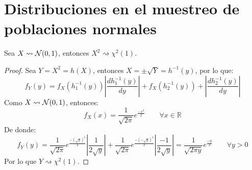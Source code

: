 
\section{Distribuciones en el muestreo de poblaciones normales}
\begin{prop}
    Sea $X\rightsquigarrow\mathcal{N}(0,1)$, entonces $X^2\rightsquigarrow \chi^2(1)$.
    \begin{proof}
        Sea $Y = X^2 = h(X)$, entonces $X = \pm \sqrt{Y} = h^{-1}(y)$, por lo que:
        \begin{equation*}
            f_Y(y) = f_X(h_1^{-1}(y)) \left|\dfrac{dh_1^{-1}(y)}{dy}\right| + f_X(h_2^{-1}(y)) + \left|\dfrac{dh_2^{-1}(y)}{dy}\right| 
        \end{equation*}
        Como $X\rightsquigarrow \mathcal{N}(0,1)$, entonces:
        \begin{equation*}
            f_X(x) = \dfrac{1}{\sqrt{2\pi}} e^{\frac{-x^2}{2}} \qquad \forall x\in \mathbb{R}
        \end{equation*}
        De donde:
        \begin{equation*}
            f_Y(y) = \dfrac{1}{\sqrt{2\pi}} e^{\frac{-{(\sqrt{y})}^{2}}{2}} \left|\dfrac{1}{2\sqrt{y}}\right| + \dfrac{1}{\sqrt{2\pi}} e^{\frac{-{(-\sqrt{y})}^{2}}{2}} \left|\dfrac{-1}{2\sqrt{y}}\right|  = \dfrac{1}{\sqrt{2\pi y}} e^{\frac{-y}{2}} \qquad \forall y>0
        \end{equation*}
        Por lo que $Y\rightsquigarrow\chi^2(1)$.
    \end{proof}
\end{prop}

